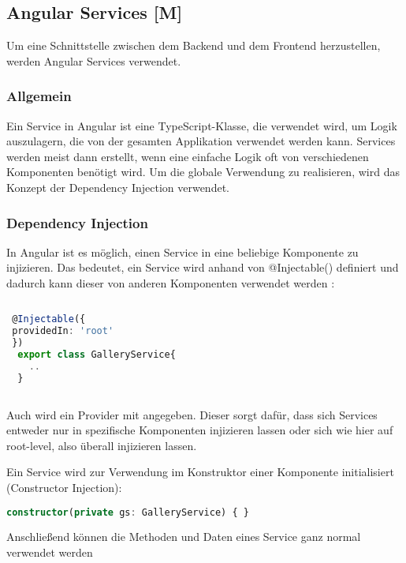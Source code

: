 \subsection{Angular Services [M]}
Um eine Schnittstelle zwischen dem Backend und dem Frontend herzustellen, werden Angular Services verwendet.

\subsubsection{Allgemein}
Ein Service in Angular ist eine TypeScript-Klasse, die verwendet wird, um Logik auszulagern, die von der gesamten Applikation verwendet werden kann. Services werden meist dann erstellt, wenn eine einfache Logik oft von verschiedenen Komponenten benötigt wird. Um die globale Verwendung zu realisieren, wird das Konzept der Dependency Injection verwendet. \cite{AngularBuch} \cite{AngularArchitectureService}

\subsubsection{Dependency Injection}
\label{DPI}
In Angular ist es möglich, einen Service in eine beliebige Komponente zu injizieren. Das bedeutet, ein Service wird anhand von @Injectable() definiert und dadurch kann dieser von anderen Komponenten verwendet werden \cite{AngularBuch}:

\begin{lstlisting}[caption={Eine Klasse Injectable machen},  language=TypeScript,label=lst:impl:injectable]   
    
 @Injectable({
 providedIn: 'root'
 })
  export class GalleryService{
    ..
  }
   
\end{lstlisting}

Auch wird ein Provider mit angegeben. Dieser sorgt dafür, dass sich Services entweder nur in spezifische Komponenten injizieren lassen oder sich wie hier auf root-level, also überall injizieren lassen. \cite{AngularBuch}

Ein Service wird zur Verwendung im Konstruktor einer Komponente initialisiert (Constructor Injection): 

\begin{lstlisting}[caption={Constructor Injection},  language=TypeScript,label=lst:impl:concstructorinjection]   
    constructor(private gs: GalleryService) { }
\end{lstlisting}
Anschließend können die Methoden und Daten eines Service ganz normal verwendet werden

